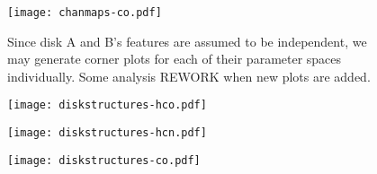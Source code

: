 

\begin{figure}[htp]
  \hspace*{\fill}%
  \texttt{[image: chanmaps-co.pdf]}\hfill%
  \hspace*{\fill}%
  \caption{Since disk A and B's features are assumed to be independent, we may generate corner plots for each of their parameter spaces individually. Some analysis REWORK when new plots are added.}
  \label{fig:co_chanmaps}
\end{figure}






\begin{figure}
  \centering
  \begin{minipage}{\textwidth}
    \centering
    \texttt{[image: diskstructures-hco.pdf]}
    \label{fig:disk_str_hco}
  \end{minipage}%
  \par %
  \begin{minipage}{\textwidth}
    \centering
    \texttt{[image: diskstructures-hcn.pdf]}
    \label{fig:disk_str_hcn}
  \end{minipage}%
  \par %
  \begin{minipage}{\textwidth}
    \centering
    \texttt{[image: diskstructures-co.pdf]}
    \label{fig:disk_str_co}
  \end{minipage}%
  \label{fig:noise-profiles}
\end{figure}


